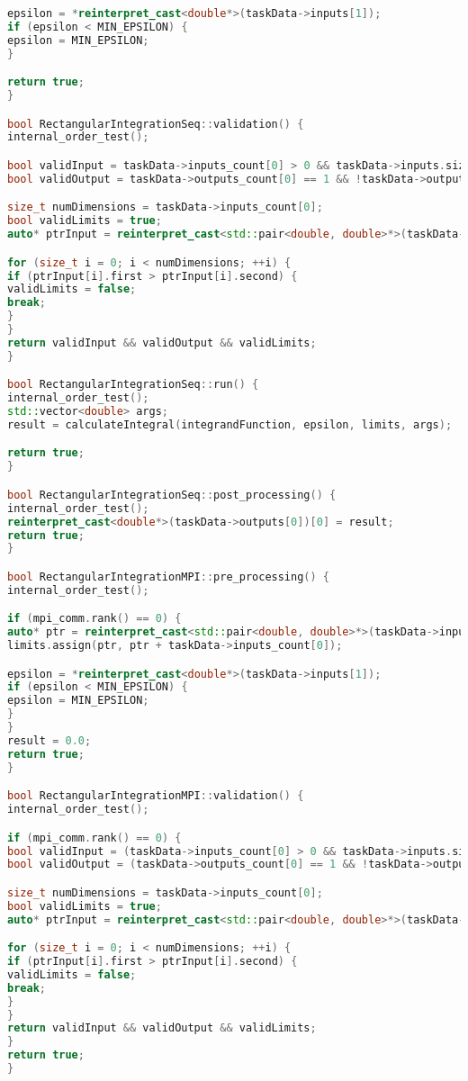 \documentclass[12pt]{article}
\begin{document}
\begin{lstlisting}[language=C++]
epsilon = *reinterpret_cast<double*>(taskData->inputs[1]);
if (epsilon < MIN_EPSILON) {
epsilon = MIN_EPSILON;
}

return true;
}

bool RectangularIntegrationSeq::validation() {
internal_order_test();

bool validInput = taskData->inputs_count[0] > 0 && taskData->inputs.size() == 2;
bool validOutput = taskData->outputs_count[0] == 1 && !taskData->outputs.empty();

size_t numDimensions = taskData->inputs_count[0];
bool validLimits = true;
auto* ptrInput = reinterpret_cast<std::pair<double, double>*>(taskData->inputs[0]);

for (size_t i = 0; i < numDimensions; ++i) {
if (ptrInput[i].first > ptrInput[i].second) {
validLimits = false;
break;
}
}
return validInput && validOutput && validLimits;
}

bool RectangularIntegrationSeq::run() {
internal_order_test();
std::vector<double> args;
result = calculateIntegral(integrandFunction, epsilon, limits, args);

return true;
}

bool RectangularIntegrationSeq::post_processing() {
internal_order_test();
reinterpret_cast<double*>(taskData->outputs[0])[0] = result;
return true;
}

bool RectangularIntegrationMPI::pre_processing() {
internal_order_test();

if (mpi_comm.rank() == 0) {
auto* ptr = reinterpret_cast<std::pair<double, double>*>(taskData->inputs[0]);
limits.assign(ptr, ptr + taskData->inputs_count[0]);

epsilon = *reinterpret_cast<double*>(taskData->inputs[1]);
if (epsilon < MIN_EPSILON) {
epsilon = MIN_EPSILON;
}
}
result = 0.0;
return true;
}

bool RectangularIntegrationMPI::validation() {
internal_order_test();

if (mpi_comm.rank() == 0) {
bool validInput = (taskData->inputs_count[0] > 0 && taskData->inputs.size() == 2);
bool validOutput = (taskData->outputs_count[0] == 1 && !taskData->outputs.empty());

size_t numDimensions = taskData->inputs_count[0];
bool validLimits = true;
auto* ptrInput = reinterpret_cast<std::pair<double, double>*>(taskData->inputs[0]);

for (size_t i = 0; i < numDimensions; ++i) {
if (ptrInput[i].first > ptrInput[i].second) {
validLimits = false;
break;
}
}
return validInput && validOutput && validLimits;
}
return true;
}


\end{lstlisting}
\end{document}
